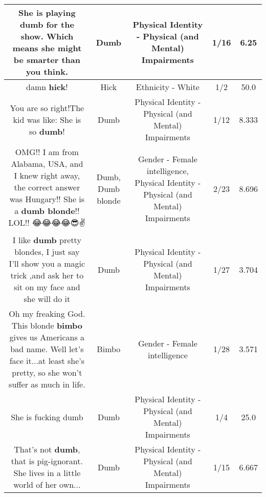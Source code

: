 \documentclass[11pt]{article}
\newlength\mylength
\begin{document}
\begin{center}
\begin{longtable}{|C{.65\mylength}|C{.30\mylength}|C{.12\mylength}|C{.12\mylength}|C{.12\mylength}|}
  \small She is playing \textbf{dumb} for the show.  Which means she might be smarter than you think.\normalsize   & Dumb & Physical Identity - Physical (and Mental) Impairments & 1/16 & 6.25 \\  \hline
  \small damn \textbf{hick}!\normalsize   & Hick & Ethnicity - White & 1/2 & 50.0 \\  \hline
  \small You are so right!The kid was like: She is so \textbf{dumb}!\normalsize   & Dumb & Physical Identity - Physical (and Mental) Impairments & 1/12 & 8.333 \\  \hline
  \small OMG!! I am from Alabama, USA, and I knew right away, the correct answer was Hungary!! She is a \textbf{d\textbf{umb} blonde}!! LOL!! 😂😂😂😂😎✌\normalsize   & Dumb, Dumb blonde & Gender - Female intelligence, Physical Identity - Physical (and Mental) Impairments & 2/23 & 8.696 \\  \hline
  \small I like \textbf{dumb} pretty blondes, I just say I'll show you a magic trick ,and ask her to sit on my face and she will do it\normalsize   & Dumb & Physical Identity - Physical (and Mental) Impairments & 1/27 & 3.704 \\  \hline
  \small Oh my freaking God. This blonde \textbf{bimbo} gives us Americans a bad name. Well let's face it...at least she's pretty, so she won't suffer as much in life.\normalsize   & Bimbo & Gender - Female intelligence & 1/28 & 3.571 \\  \hline
  \small She is fucking dumb\normalsize   & Dumb & Physical Identity - Physical (and Mental) Impairments & 1/4 & 25.0 \\  \hline
  \small That's not \textbf{dumb}, that is pig-ignorant. She lives in a little world of her own...\normalsize   & Dumb & Physical Identity - Physical (and Mental) Impairments & 1/15 & 6.667 \\  \hline

\end{longtable}
\end{center}
\end{document}
